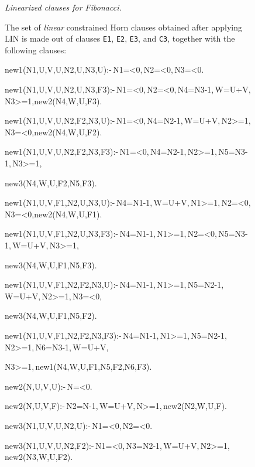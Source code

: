\documentclass[english]{tlp}
\newcommand{\tts}{\tt \small}
\begin{document}
\begin{figure}[ht]
\begin{flushleft}
\begin{minipage}{124mm}
\bigskip

\noindent
{\it Linearized clauses for Fibonacci.} 

\noindent
The set of {\it linear} constrained Horn clauses obtained after applying LIN
is made out of clauses {\tts E1}, {\tts E2}, 
{\tts E3}, and {\tts C3}, together with the following clauses:
\vspace{1.5mm}

\smallskip
{\small{\tts{

\noindent
new1(N1,U,V,U,N2,U,N3,U):-\,N1=<0,\,N2=<0,\,N3=<0.

\noindent
new1(N1,U,V,U,N2,U,N3,F3):-\,N1=<0,\,N2=<0,\,N4=N3-1,\,W=U+V,\,N3>=1,new2(N4,W,U,F3).

\noindent             
new1(N1,U,V,U,N2,F2,N3,U):-\,N1=<0,\,N4=N2-1,\,W=U+V,\,N2>=1,\,N3=<0,new2(N4,W,U,F2).
 
\noindent            
new1(N1,U,V,U,N2,F2,N3,F3):-\,N1=<0,\,N4=N2-1,\,N2>=1,\,N5=N3-1,\,N3>=1,\par\hspace{12mm}  
             new3(N4,W,U,F2,N5,F3).

\noindent             
new1(N1,U,V,F1,N2,U,N3,U):-\,N4=N1-1,\,W=U+V,\,N1>=1,\,N2=<0,\,N3=<0,new2(N4,W,U,F1).
 
\noindent            
new1(N1,U,V,F1,N2,U,N3,F3):-\,N4=N1-1,\,N1>=1,\,N2=<0,\,N5=N3-1,\,W=U+V,\,N3>=1,\nopagebreak\par\hspace{12mm}  
             new3(N4,W,U,F1,N5,F3).

\noindent             
new1(N1,U,V,F1,N2,F2,N3,U):-\,N4=N1-1,\,N1>=1,\,N5=N2-1,\,W=U+V,\,N2>=1,\,N3=<0,\nopagebreak\par\hspace{12mm}   
             new3(N4,W,U,F1,N5,F2).

\noindent             
new1(N1,U,V,F1,N2,F2,N3,F3):-\,N4=N1-1,\,N1>=1,\,N5=N2-1,\,N2>=1,\,N6=N3-1,\,W=U+V,
\nopagebreak\par\hspace{12mm} N3>=1,\,new1(N4,W,U,F1,N5,F2,N6,F3).
 
\noindent            
new2(N,U,V,U):-\,N=<0.

\noindent
new2(N,U,V,F):-\,N2=N-1,\,W=U+V,\,N>=1,\,new2(N2,W,U,F).

\noindent
new3(N1,U,V,U,N2,U):-\,N1=<0,\,N2=<0.

\noindent
new3(N1,U,V,U,N2,F2):-\,N1=<0,\,N3=N2-1,\,W=U+V,\,N2>=1,\,new2(N3,W,U,F2).

}}}
\end{minipage}
\end{flushleft}
\end{figure}
\end{document}
